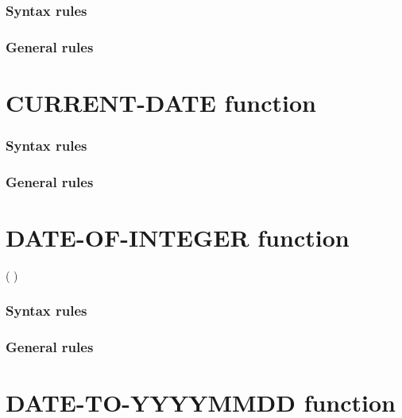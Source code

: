 \begin{syntax}[\gnucobolcolour]
   
\end{syntax}

\subsubsection{Syntax rules}

\subsubsection{General rules}

\section{CURRENT-DATE function}

\begin{syntax}
   
\end{syntax}

\subsubsection{Syntax rules}

\subsubsection{General rules}

\section{DATE-OF-INTEGER function}

\begin{syntax}
    ( \argument )
\end{syntax}

\subsubsection{Syntax rules}

\subsubsection{General rules}

\section{DATE-TO-YYYYMMDD function}

